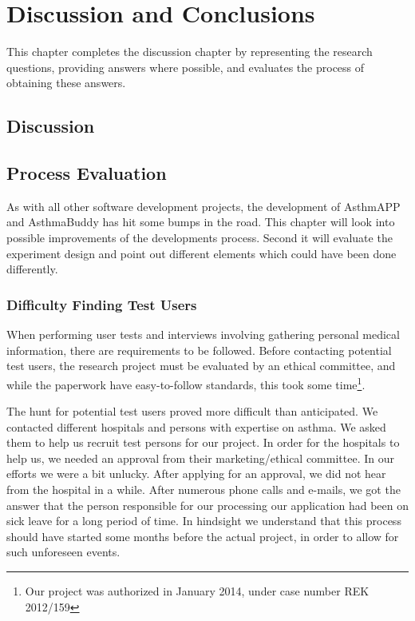 \chapter{Discussion and Conclusions}
\label{chp:masterconclusion}

This chapter completes the discussion chapter by representing the research questions, providing answers where possible, and evaluates the process of obtaining these answers. 

\section{Discussion}
\label{sec:discussion}




\section{Process Evaluation}
\label{sec:processevaluation}
As with all other software development projects, the development of AsthmAPP and AsthmaBuddy has hit some bumps in the road. This chapter will look into possible improvements of the developments process. Second it will evaluate the experiment design and point out different elements which could have been done differently.

\subsection{Difficulty Finding Test Users}
\label{sec:difficultyfindingtestusers}
When performing user tests and interviews involving gathering personal medical information, there are requirements to be followed. Before contacting potential test users, the research project must be evaluated by an ethical committee, and while the paperwork have easy-to-follow standards, this took some time\footnote{Our project was authorized in January 2014, under case number REK 2012/159}. 

The hunt for potential test users proved more difficult than anticipated. We contacted different hospitals and persons with expertise on asthma. We asked them to help us recruit test persons for our project. In order for the hospitals to help us, we needed an approval from their marketing/ethical committee. In our efforts we were a bit unlucky. After applying for an approval, we did not hear from the hospital in a while. After numerous phone calls and e-mails, we got the answer that the person responsible for our processing our application had been on sick leave for a long period of time. In hindsight we understand that this process should have started some months before the actual project, in order to allow for such unforeseen events. 

